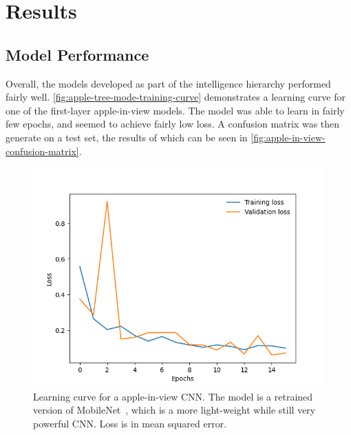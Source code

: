 \section{Results}
\subsection{Model Performance}\label{subsec:model-performance}
Overall, the models developed as part of the intelligence hierarchy performed fairly well.
\autoref{fig:apple-tree-mode-training-curve} demonstrates a learning curve for one of the first-layer apple-in-view models.
The model was able to learn in fairly few epochs, and seemed to achieve fairly low loss.
A confusion matrix was then generate on a test set, the results of which can be seen in \autoref{fig:apple-in-view-confusion-matrix}.

\begin{figure}[!htb]
    \centering
    \includegraphics[width=\columnwidth,keepaspectratio]
    {./figures/mobile_model_apple_trees_16its_2022-11-15_training_curve}
    \caption{
        Learning curve for a apple-in-view CNN.
        The model is a retrained version of MobileNet~\cite{Sandler2018,PyTorchMobileNet}, which is a more light-weight while still very powerful CNN.
        Loss is in mean squared error.
    }
    \label{fig:apple-tree-mode-training-curve}
\end{figure}

